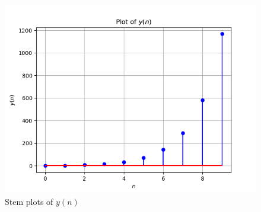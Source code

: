 \documentclass[journal,12pt,onecolumn]{IEEEtran}
\theoremstyle{remark}
\begin{document}
\begin{figure}[h!]
    \centering
    \includegraphics[width=\columnwidth]{figs/plot.png}
    \caption{Stem plots of $y(n)$}
    \label{fig:11.9.3.14.2}
\end{figure}
\end{document}
